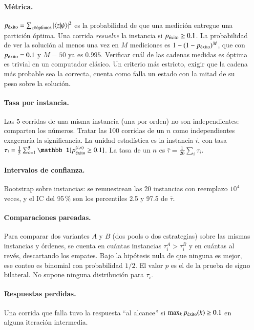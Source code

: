 \documentclass[11pt,a4paper]{article}
\newcommand{\pex}{p_{\rm \acute{e}xito}}
\begin{document}
\paragraph{Métrica.} $\pex=\sum_{z\in\text{óptimos}}|\langle z|\psi\rangle|^2$ es la probabilidad
de que una medición entregue una partición óptima. Una corrida \emph{resuelve} la instancia si
$\pex\geq0.1$. La probabilidad de ver la solución al menos una vez en $M$ mediciones es
$1-(1-\pex)^M$, que con $\pex=0.1$ y $M=50$ ya es $0.995$. Verificar cuál de las cadenas medidas es
óptima es trivial en un computador clásico. Un criterio más estricto, exigir que la cadena más
probable sea la correcta, cuenta como falla un estado con la mitad de su peso sobre la solución.

\paragraph{Tasa por instancia.} Las 5 corridas de una misma instancia (una por orden) no son
independientes: comparten los números. Tratar las 100 corridas de un $n$ como independientes
exageraría la significancia. La unidad estadística es la instancia $i$, con tasa
$\tau_i=\frac15\sum_{o=1}^5\mathbb 1[\pex^{(i,o)}\geq0.1]$. La tasa de un $n$ es
$\bar\tau=\frac1{20}\sum_i\tau_i$.

\paragraph{Intervalos de confianza.} Bootstrap sobre instancias: se remuestrean las 20 instancias
con reemplazo $10^4$ veces, y el IC del 95\,\% son los percentiles 2.5 y 97.5 de $\bar\tau$.

\paragraph{Comparaciones pareadas.} Para comparar dos variantes $A$ y $B$ (dos pools o dos
estrategias) sobre las mismas instancias y órdenes, se cuenta en cuántas instancias
$\tau_i^A>\tau_i^B$ y en cuántas al revés, descartando los empates. Bajo la hipótesis nula de que
ninguna es mejor, ese conteo es binomial con probabilidad $1/2$. El valor $p$ es el de la prueba de
signo bilateral. No supone ninguna distribución para $\tau_i$.

\paragraph{Respuestas perdidas.} Una corrida que falla tuvo la respuesta ``al alcance'' si
$\max_k\pex(k)\geq0.1$ en alguna iteración intermedia.
\end{document}

